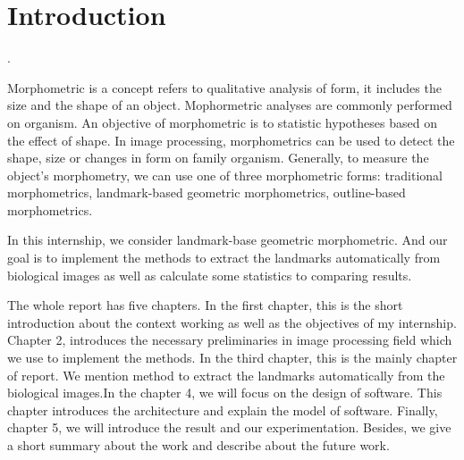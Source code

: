 \chapter*{Introduction}.

Morphometric is a concept refers to qualitative analysis of form, it includes the size and the shape of an object. Mophormetric analyses are commonly performed on organism. An objective of morphometric is to statistic hypotheses based on the effect of shape.
In image processing, morphometrics can be used to detect the shape, size or changes in form on family organism. Generally, to measure the object's morphometry, we can use one of three morphometric forms: traditional morphometrics, landmark-based geometric morphometrics, outline-based morphometrics.  

In this internship, we consider landmark-base geometric morphometric. And our goal is to implement the methods to extract the landmarks automatically from biological images as well as calculate some statistics to comparing results.

The whole report has five chapters. In the first chapter, this is the short introduction about the context working as well as the objectives of my internship. Chapter 2, introduces the necessary preliminaries in image processing field which we use to implement the methods. In the third chapter, this is the mainly chapter of report. We mention method to extract the landmarks automatically from the biological images.In the chapter 4, we will focus on the design of software. This chapter introduces the architecture and explain the model of software. Finally, chapter 5, we will introduce the result and our experimentation. Besides, we give a short summary about the work and describe about the future work.